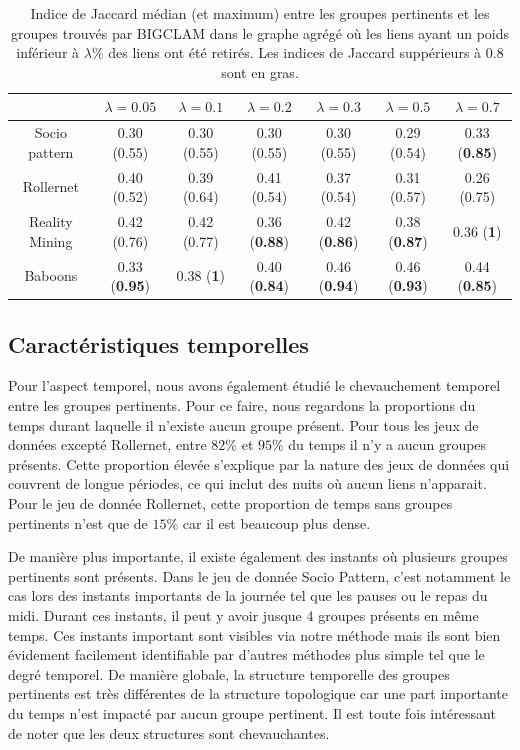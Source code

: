 \begin{table}
\centering
\begin{tabular}{|c|c|c|c|c|c|c|}
\hline  \rule[-1ex]{0pt}{3.5ex}  & $\lambda= 0.05$ &$\lambda= 0.1$ & $\lambda=0.2$ & $\lambda=0.3$ & $\lambda=0.5$ & $\lambda=0.7$ \\ 
\hline Socio pattern & 0.30 (0.55)  & 0.30 (0.55)  & 0.30 (0.55)  & 0.30 (0.55)  & 0.29 (0.54) & 0.33 (\textbf{0.85})  \\ 
\hline Rollernet & 0.40 (0.52) & 0.39 (0.64) & 0.41 (0.54) & 0.37 (0.54) & 0.31 (0.57)  &  0.26 (0.75) \\ 
\hline Reality Mining & 0.42 (0.76)  & 0.42 (0.77) & 0.36 (\textbf{0.88}) & 0.42 (\textbf{0.86}) & 0.38 (\textbf{0.87})  & 0.36 (\textbf{1}) \\ 
\hline Baboons & 0.33 (\textbf{0.95}) & 0.38 (\textbf{1}) & 0.40 (\textbf{0.84}) & 0.46 (\textbf{0.94}) & 0.46 (\textbf{0.93}) & 0.44 (\textbf{0.85}) \\ 
\hline 
\end{tabular} 
\caption{Indice de Jaccard médian (et maximum) entre les groupes pertinents et les groupes trouvés par \textsc{BIGCLAM} dans le graphe agrégé où  les liens ayant un poids inférieur à $\lambda\%$ des liens ont été retirés.
Les indices de Jaccard suppérieurs à $0.8$ sont en gras.}
\label{tab:Jaccard}  
\end{table}

\subsection{Caractéristiques temporelles}
Pour l'aspect temporel, nous avons également étudié le chevauchement temporel entre les groupes pertinents.
Pour ce faire, nous regardons la proportions du temps durant laquelle il n'existe aucun groupe présent.
Pour tous les jeux de données excepté Rollernet, entre $82\%$ et $95\%$ du temps il n'y a aucun groupes présents.
Cette proportion élevée s'explique par la nature des jeux de données qui couvrent de longue périodes, ce qui inclut des nuits où aucun liens n'apparait.
Pour le jeu de donnée Rollernet, cette proportion de temps sans groupes pertinents n'est que de $15\%$ car il est beaucoup plus dense.

De manière plus importante, il existe également des instants où plusieurs groupes pertinents sont présents.
Dans le jeu de donnée Socio Pattern, c'est notamment le cas lors des instants importants de la journée tel que les pauses ou le repas du midi.
Durant ces instants, il peut y avoir jusque $4$ groupes présents en même temps.
Ces instants important sont visibles via notre méthode mais ils sont bien évidement facilement identifiable par d'autres méthodes plus simple tel que le degré temporel.
De manière globale, la structure temporelle des groupes pertinents est très différentes de la structure topologique car une part importante du temps n'est impacté par aucun groupe pertinent.
Il est toute fois intéressant de noter que les deux structures sont chevauchantes. 




